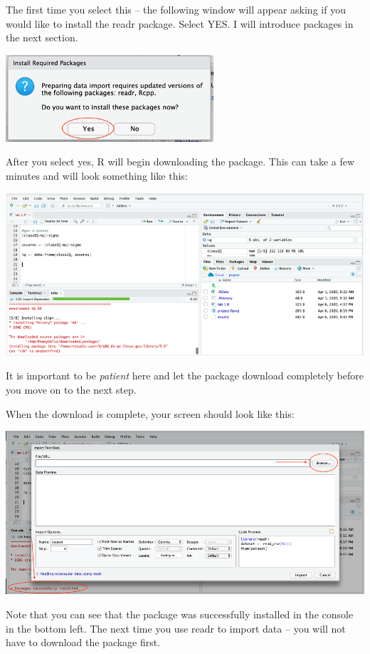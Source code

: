 \documentclass[
]{book}
\begin{document}
The first time you select this -- the following window will appear asking if you would like to install the readr package. Select YES. I will introduce packages in the next section.

\includegraphics{img/installreadrbox.png}

After you select yes, R will begin downloading the package. This can take a few minutes and will look something like this:

\includegraphics{img/installreadr.png}

It is important to be \emph{patient} here and let the package download completely before you move on to the next step.

When the download is complete, your screen should look like this:

\includegraphics{img/importwindow.png}

Note that you can see that the package was successfully installed in the console in the bottom left. The next time you use readr to import data -- you will not have to download the package first.
\end{document}
